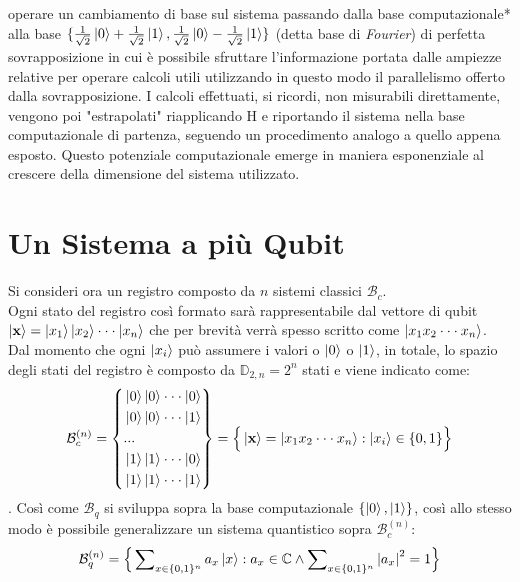 \documentclass[12pt,a4paper,openright]{report}
\begin{document}
operare un cambiamento di base \cite{ref8} sul sistema passando dalla base computazionale* alla base $\{\frac{1}{\sqrt2}\ket0 + \frac{1}{\sqrt2}\ket1, \frac{1}{\sqrt2}\ket0 - \frac{1}{\sqrt2}\ket1\}$ (detta base di \emph{Fourier}) di
perfetta sovrapposizione in cui è possibile sfruttare l'informazione portata dalle ampiezze relative per operare calcoli utili utilizzando in questo modo il parallelismo offerto dalla sovrapposizione. I calcoli effettuati,
si ricordi, non misurabili direttamente, vengono poi "estrapolati" riapplicando H e riportando il sistema nella base computazionale di partenza, seguendo un procedimento analogo a quello appena esposto.
Questo potenziale computazionale emerge in maniera esponenziale al crescere della dimensione del sistema utilizzato.

\section{Un Sistema a più Qubit}
Si consideri ora un registro composto da $n$ sistemi classici $\mathcal{B}_c$.\\
Ogni stato del registro così formato sarà rappresentabile dal vettore di qubit $\ket{\textbf{x}}= \ket{x_1}\ket{x_2}\cdot\cdot\cdot\ket{x_n}$ che per brevità verrà spesso scritto come $\ket{x_1 x_2 \cdot\cdot\cdot x_n}$.
Dal momento che ogni $\ket{x_i}$ può assumere i valori o $\ket0$ o $\ket1$, in totale, lo spazio degli stati del registro è composto da $\mathbb{D}_{2,n}=2^n$ stati e viene indicato come:
\begin{equation*}
    \mathcal{B}_c^{(n)} = \left\{ 
    \begin{aligned}
        & \ket0 \ket0 \cdot \cdot \cdot \ket0 \\
        & \ket0 \ket0 \cdot \cdot \cdot \ket1 \\
        & ... \\
        & \ket1 \ket1 \cdot \cdot \cdot \ket0 \\
        & \ket1 \ket1 \cdot \cdot \cdot \ket1
    \end{aligned}
    \right\} = \Big\{\ket{\textbf{x}}=\ket{x_1 x_2 \cdot \cdot \cdot x_n} : \ket{x_i} \in \{0,1\} \Big\}
\end{equation*}
. Così come $\mathcal{B}_q$ si sviluppa sopra la base computazionale $\{\ket0, \ket1 \}$, così allo stesso modo è possibile generalizzare un sistema quantistico sopra $\mathcal{B}_c^{(n)}$:
\[
    \mathcal{B}_q^{(n)} = \Big\{ \sum\nolimits_{x \in \{0,1\}^{n}} a_x \ket{x} : a_x \in \mathbb{C} \land \sum\nolimits_{x\in\{0,1\}^{n}} {\left\vert{a_x}\right\vert}^2 = 1\Big\}
\]
\end{document}
